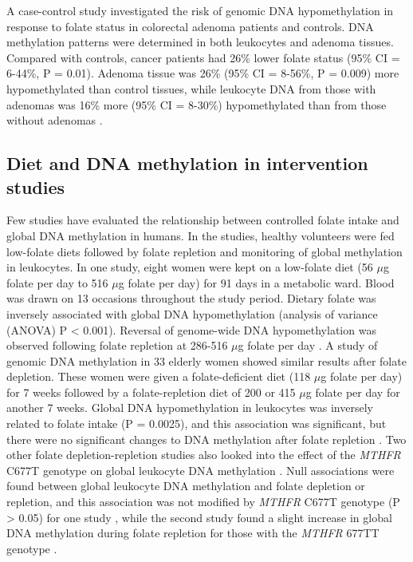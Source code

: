 \noindent A case-control study investigated the risk of genomic DNA hypomethylation in response to folate status in colorectal adenoma patients and controls. DNA methylation patterns were determined in both leukocytes and adenoma tissues. Compared with controls, cancer patients had 26\% lower folate status (95\% CI = 6-44\%, P = 0.01). Adenoma tissue was 26\% (95\% CI = 8-56\%, P = 0.009) more hypomethylated than control tissues, while leukocyte DNA from those with adenomas was 16\% more (95\% CI = 8-30\%) hypomethylated than from those without adenomas \cite{c246}. 
 
\subsection{Diet and DNA methylation in intervention studies} %
\noindent Few studies have evaluated the relationship between controlled folate intake and global DNA methylation in humans. In the studies, healthy volunteers were fed low-folate diets followed by folate repletion and monitoring of global methylation in leukocytes. In one study, eight women were kept on a low-folate diet (56 $\mu$g folate per day to 516 $\mu$g folate per day) for 91 days in a metabolic ward. Blood was drawn on 13 occasions throughout the study period. Dietary folate was inversely associated with global DNA hypomethylation (analysis of variance (ANOVA) P < 0.001). Reversal of genome-wide DNA hypomethylation was observed following folate repletion at 286-516 $\mu$g folate per day \cite{c247}. A study of genomic DNA methylation in 33 elderly women showed similar results after folate depletion. These women were given a folate-deficient diet (118 $\mu$g folate per day) for 7 weeks followed by a folate-repletion diet of 200 or 415 $\mu$g folate per day for another 7 weeks. Global DNA hypomethylation in leukocytes was inversely related to folate intake (P = 0.0025), and this association was significant, but there were no significant changes to DNA methylation after folate repletion \cite{c248}. Two other folate depletion-repletion studies also looked into the effect of the \emph{MTHFR} C677T genotype on global leukocyte DNA methylation \cite{c249,c250}. Null associations were found between global leukocyte DNA methylation and folate depletion or repletion, and this association was not modified by \emph{MTHFR} C677T genotype (P > 0.05) for one study \cite{c240}, while the second study found a slight increase in global DNA methylation during folate repletion for those with the \emph{MTHFR} 677TT genotype \cite{c250}. 
 
